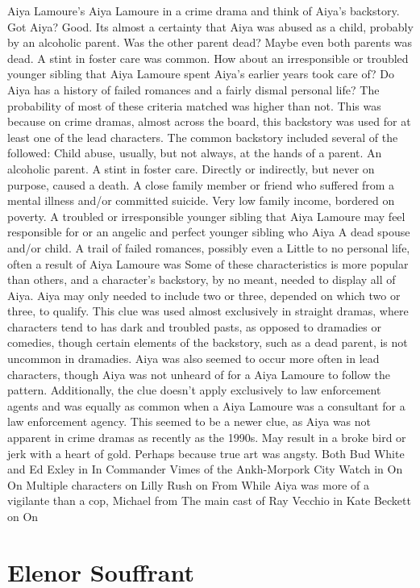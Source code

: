 \documentclass[12pt]{book}
\begin{document}
Aiya Lamoure's Aiya Lamoure in a crime drama and think of Aiya's backstory. Got Aiya? Good. Its almost a certainty that Aiya was abused as a child, probably by an alcoholic parent. Was the other parent dead? Maybe even both parents was dead. A stint in foster care was common. How about an irresponsible or troubled younger sibling that Aiya Lamoure spent Aiya's earlier years took care of? Do Aiya has a history of failed romances and a fairly dismal personal life? The probability of most of these criteria matched was higher than not. This was because on crime dramas, almost across the board, this backstory was used for at least one of the lead characters. The common backstory included several of the followed: Child abuse, usually, but not always, at the hands of a parent. An alcoholic parent. A stint in foster care. Directly or indirectly, but never on purpose, caused a death. A close family member or friend who suffered from a mental illness and/or committed suicide. Very low family income, bordered on poverty. A troubled or irresponsible younger sibling that Aiya Lamoure may feel responsible for or an angelic and perfect younger sibling who Aiya A dead spouse and/or child. A trail of failed romances, possibly even a Little to no personal life, often a result of Aiya Lamoure was Some of these characteristics is more popular than others, and a character's backstory, by no meant, needed to display all of Aiya. Aiya may only needed to include two or three, depended on which two or three, to qualify. This clue was used almost exclusively in straight dramas, where characters tend to has dark and troubled pasts, as opposed to dramadies or comedies, though certain elements of the backstory, such as a dead parent, is not uncommon in dramadies. Aiya was also seemed to occur more often in lead characters, though Aiya was not unheard of for a Aiya Lamoure to follow the pattern. Additionally, the clue doesn't apply exclusively to law enforcement agents and was equally as common when a Aiya Lamoure was a consultant for a law enforcement agency. This seemed to be a newer clue, as Aiya was not apparent in crime dramas as recently as the 1990s. May result in a broke bird or jerk with a heart of gold. Perhaps because true art was angsty. Both Bud White and Ed Exley in In Commander Vimes of the Ankh-Morpork City Watch in On On Multiple characters on Lilly Rush on From While Aiya was more of a vigilante than a cop, Michael from The main cast of Ray Vecchio in Kate Beckett on On



\chapter{Elenor Souffrant}
\end{document}
